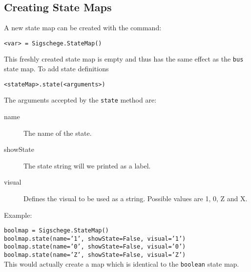 \documentclass[11pt]{article}
\begin{document}
\subsection{Creating State Maps}
\label{sec:tis}

A new state map can be created with the command:

\begin{center}
  \texttt{<var> = Sigschege.StateMap()}
\end{center}

This freshly created state map is empty and thus has the same effect as the
\texttt{bus} state map. To add state definitions

\begin{center}
  \texttt{<stateMap>.state(<arguments>)}
\end{center}

The arguments accepted by the \texttt{state} method are:

\begin{description}
\item[name] The name of the state.
\item[showState] The state string will we printed as a label.
\item[visual] Defines the visual to be used as a string. Possible values are 1, 0, Z and X.
\end{description}

Example:

\texttt{boolmap = Sigschege.StateMap()}\\
\texttt{boolmap.state(name='1', showState=False, visual='1')}\\
\texttt{boolmap.state(name='0', showState=False, visual='0')}\\
\texttt{boolmap.state(name='Z', showState=False, visual='Z')}\\

This would actually create a map which is identical to the \texttt{boolean}
state map.
\end{document}
